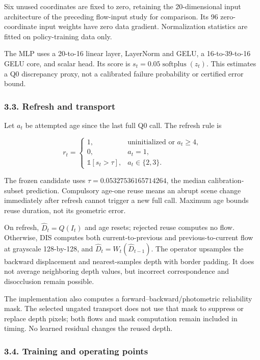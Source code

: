 \documentclass[
  10pt,
]{article}
\begin{document}
Six unused coordinates are fixed to zero, retaining the 20-dimensional
input architecture of the preceding flow-input study for comparison. Its
96 zero-coordinate input weights have zero data gradient. Normalization
statistics are fitted on policy-training data only.

The MLP uses a 20-to-16 linear layer, LayerNorm and GELU, a
16-to-39-to-16 GELU core, and scalar head. Its score is
\(s_t=0.05\operatorname{softplus}(z_t)\). This estimates a Q0
discrepancy proxy, not a calibrated failure probability or certified
error bound.

\subsubsection{3.3. Refresh and transport}\label{refresh-and-transport}

Let \(a_t\) be attempted age since the last full Q0 call. The refresh
rule is

\[
r_t=\begin{cases}
1,&\text{uninitialized or }a_t\geq4,\\
0,&a_t=1,\\
\mathbb{1}[s_t>\tau],&a_t\in\{2,3\}.
\end{cases}
\]

The frozen candidate uses \(\tau=0.05327536165714264\), the median
calibration-subset prediction. Compulsory age-one reuse means an abrupt
scene change immediately after refresh cannot trigger a new full call.
Maximum age bounds reuse duration, not its geometric error.

On refresh, \(\widehat D_t=Q(I_t)\) and age resets; rejected reuse
computes no flow. Otherwise, DIS computes both current-to-previous and
previous-to-current flow at grayscale 128-by-128, and
\(\widehat D_t=W_t(\widehat D_{t-1})\). The operator upsamples the
backward displacement and nearest-samples depth with border padding. It
does not average neighboring depth values, but incorrect correspondence
and disocclusion remain possible.

The implementation also computes a forward--backward/photometric
reliability mask. The selected ungated transport does not use that mask
to suppress or replace depth pixels; both flows and mask computation
remain included in timing. No learned residual changes the reused depth.

\subsubsection{3.4. Training and operating
points}\label{training-and-operating-points}
\end{document}
